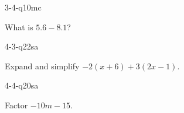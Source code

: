 \documentclass[12pt, fleqn, openany]{studyGuide}
\begin{document}
\begin{practiceQuestion}{3-4-q10}{mc}
\begin{questionText}
What is $5.6 - 8.1$?
\end{questionText}
\end{practiceQuestion}

\begin{practiceQuestion}{4-3-q22}{sa}
\begin{questionText}
Expand and simplify $-2(x + 6) + 3(2x - 1)$.
\end{questionText}
\end{practiceQuestion}

\begin{practiceQuestion}{4-4-q20}{sa}
\begin{questionText}
Factor $-10m - 15$.
\end{questionText}
\end{practiceQuestion}



\printAnswerKey


\end{document}
